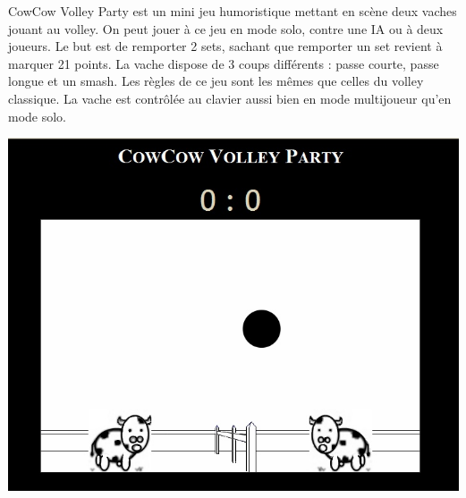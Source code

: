 \begin{minipage}{9cm}
CowCow Volley Party est un mini jeu humoristique mettant en scène deux vaches jouant au volley.
On peut jouer à ce jeu en mode solo, contre une IA ou à deux joueurs. 
Le but est de remporter 2 sets, sachant que remporter un set revient à marquer 21 points. 
La vache dispose de 3 coups différents : passe courte, passe longue et un smash.
Les règles de ce jeu sont les mêmes que celles du volley classique.
La vache est contrôlée au clavier aussi bien en mode multijoueur qu’en mode solo.
\end{minipage}
\hfill
\begin{minipage}{6cm}
 \includegraphics[width=\linewidth]{img/capturejeu_volleycowcow}
\end{minipage}

